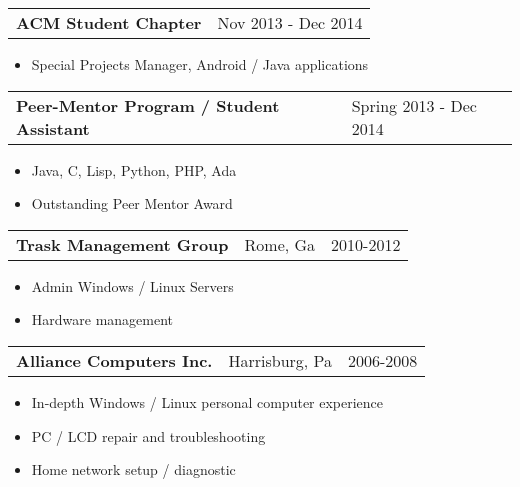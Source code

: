 \documentclass{book}
\newenvironment{myitemize}
{ \begin{itemize}
	\setlength{\itemsep}{0pt}
	\setlength{\parskip}{0pt}
	\setlength{\parsep}{0pt}     }
{ \end{itemize}                  }
\begin{document}
\begin{tabular}{L{4.75in}R{1.75in}}

	{\large {\bfseries ACM Student Chapter}} & Nov 2013 - Dec 2014 \\

\end{tabular}

	\begin{myitemize}
		\item Special Projects Manager, Android / Java applications 
	\end{myitemize}

\begin{tabular}{L{4.75in}R{1.75in}}

	{\large {\bfseries Peer-Mentor Program / Student Assistant}} & Spring 2013 - Dec 2014 \\

\end{tabular}

	\begin{myitemize}
		\item Java, C, Lisp, Python, PHP, Ada
		\item Outstanding Peer Mentor Award 
	\end{myitemize} 


\begin{tabular}{L{3in}L{1.75in}R{1.75in}}

	 {\large {\bfseries Trask Management Group}} & Rome, Ga & 2010-2012 \\

\end{tabular}

\begin{myitemize}
	
	\item Admin Windows / Linux Servers

	\item Hardware management

\end{myitemize}

\begin{tabular}{L{3in}L{1.75in}R{1.75in}}

	 {\large {\bfseries Alliance Computers Inc.}} & Harrisburg, Pa & 2006-2008 \\

\end{tabular}

\begin{myitemize}
	
	\item In-depth Windows / Linux personal computer experience
	\item PC / LCD repair and troubleshooting
	\item Home network setup / diagnostic

\end{myitemize}
\end{document}
